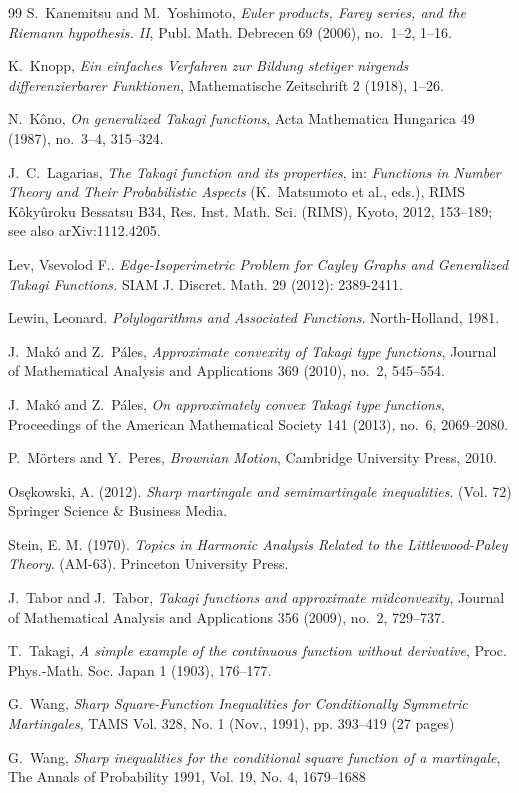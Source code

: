 \documentclass[11pt]{amsart}
\theoremstyle{definition}
\renewcommand{\1}{{\mathbbm{1}}}
\begin{document}
\begin{thebibliography}{99}
S.~Kanemitsu and M.~Yoshimoto,
\textit{Euler products, Farey series, and the Riemann hypothesis. II},
Publ. Math. Debrecen 69 (2006), no.~1--2, 1--16.

K.~Knopp,
\textit{Ein einfaches Verfahren zur Bildung stetiger nirgends differenzierbarer Funktionen},
Mathematische Zeitschrift 2 (1918), 1--26.

N.~K{\^o}no,
\textit{On generalized Takagi functions},
Acta Mathematica Hungarica 49 (1987), no.~3--4, 315--324.

J.~C.~Lagarias,
\textit{The Takagi function and its properties},
in: \textit{Functions in Number Theory and Their Probabilistic Aspects}
(K.~Matsumoto et al., eds.),
RIMS K\^{o}ky\^{u}roku Bessatsu B34, Res. Inst. Math. Sci. (RIMS), Kyoto, 2012, 153--189;
see also arXiv:1112.4205.

Lev, Vsevolod F.. \textit{Edge-Isoperimetric Problem for Cayley Graphs and Generalized Takagi Functions.} SIAM J. Discret. Math. 29 (2012): 2389-2411.

Lewin, Leonard. \textit{Polylogarithms and Associated Functions}.
North-Holland, 1981.

J.~Mak\'o and Z.~P\'ales,
\textit{Approximate convexity of Takagi type functions},
Journal of Mathematical Analysis and Applications 369 (2010), no.~2, 545--554.

J.~Mak\'o and Z.~P\'ales,
\textit{On approximately convex Takagi type functions},
Proceedings of the American Mathematical Society 141 (2013), no.~6, 2069--2080.

P.~M\"orters and Y.~Peres,
\textit{Brownian Motion},
Cambridge University Press, 2010.

Os\k{e}kowski, A. (2012).
\textit{Sharp martingale and semimartingale inequalities}. (Vol. 72) Springer Science \& Business Media.

Stein, E. M. (1970).
\textit{Topics in Harmonic Analysis Related to the Littlewood-Paley Theory}.
(AM-63). Princeton University Press.

J.~Tabor and J.~Tabor,
\textit{Takagi functions and approximate midconvexity},
Journal of Mathematical Analysis and Applications 356 (2009), no.~2, 729--737.

T.~Takagi,
\textit{A simple example of the continuous function without derivative},
Proc. Phys.-Math. Soc. Japan 1 (1903), 176--177.

G.~Wang, \textit{Sharp Square-Function Inequalities for Conditionally Symmetric Martingales},
TAMS Vol. 328, No. 1 (Nov., 1991), pp. 393--419 (27 pages)

G.~Wang, \textit{Sharp inequalities for the conditional square function of a martingale},
The Annals of Probability 1991, Vol. 19, No. 4, 1679--1688


\end{thebibliography}
\newpage
\end{document}
